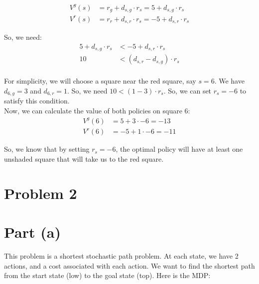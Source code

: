 \documentclass[a4paper]{article}
\begin{document}
\begin{align*}
V^{g}(s) &= r_g + d_{s,g} \cdot r_s = 5 + d_{s,g} \cdot r_s \\
V^{r}(s) &= r_r + d_{s,r} \cdot r_s = -5 + d_{s,r} \cdot r_s
\end{align*}

\noindent So, we need:
\begin{align*}
    5 + d_{s,g} \cdot r_s &< -5 + d_{s,r} \cdot r_s \\
    10 &< \left( d_{s,r} - d_{s,g} \right) \cdot r_s \\
\end{align*}

\noindent For simplicity, we will choose a square near the red square, say $s = 6$. We have $d_{6,g} = 3$ and $d_{6,r} = 1$. So, we need $10 < (1 - 3) \cdot r_s$. So, we can set $r_s = -6$ to satisfy this condition.\\

\noindent Now, we can calculate the value of both policies on square 6:
\begin{align*}
V^{g}(6) &= 5 + 3 \cdot -6 = -13 \\
V^{r}(6) &= -5 + 1 \cdot -6 = -11
\end{align*}

\noindent So, we know that by setting $r_s = -6$, the optimal policy will have at least one unshaded square that will take us to the red square.


\newpage
\section*{Problem 2}
\section*{Part (a)}
This problem is a shortest stochastic path problem. At each state, we have 2 actions, and a cost associated with each action. We want to find the shortest path from the start state (low) to the goal state (top). Here is the MDP:\\
\end{document}
